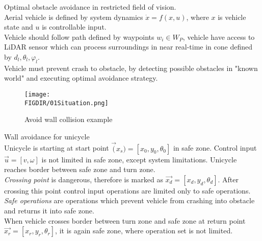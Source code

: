 \begin{problem}{Optimal obstacle avoidance in restricted field of vision.} \\Aerial vehicle is defined by system dynamics $\dot{x}=f(x,u)$, where $x$ is vehicle state and $u$ is controllable input.\\
Vehicle should follow path defined by waypoints $w_i \in W_P$, vehicle have access to LiDAR sensor which can process surroundings in near real-time in cone defined by $d_l, \theta_l, \varphi_l$.\\
Vehicle must prevent crash to obstacle, by detecting possible obstacles in "known world" and executing optimal avoidance strategy.
\end{problem}

\begin{figure}[H]
    \centering
    \texttt{[image: \\FIGDIR/01Situation.png]}
    \caption{Avoid wall collision example}
    \label{fig:generalproblem}
\end{figure}

\newpage
\begin{example}{Wall avoidance for unicycle}\label{ex:avoidwallcolision}
    \\
    Unicycle is starting at start point $\vec(x_s) = [x_0, y_0, \theta_0]$ in safe zone. Control input $\vec{u} = [v, \omega]$ is not limited in safe zone, except system limitations. Unicycle reaches border between safe zone and turn zone. \\\textit{Crossing point} is dangerous, therefore is marked as $\vec{x_d} = [x_d, y_d, \theta_d]$. After crossing this point control input operations are limited only to safe operations. 
    \\\textit{Safe operations} are operations which prevent vehicle from crashing into obstacle and returns it into safe zone.
    \\When vehicle crosses border between turn zone and safe zone at return point $\vec{x_r} = [x_r, y_r, \theta_r]$, it is again safe zone, where operation set is not limited.
\end{example}

